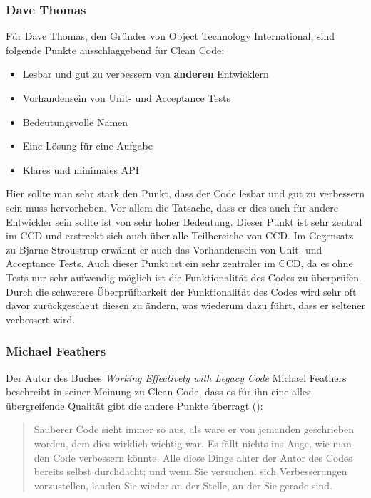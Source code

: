 \subsubsection{Dave Thomas}
Für Dave Thomas, den Gründer von Object Technology International,  sind folgende Punkte ausschlaggebend für Clean Code:

\begin{itemize}
	\item Lesbar und gut zu verbessern von \textbf{anderen} Entwicklern
	\item Vorhandensein von Unit- und Acceptance Tests
	\item Bedeutungsvolle Namen
	\item Eine Lösung für eine Aufgabe
	\item Klares und minimales API
\end{itemize}

Hier sollte man sehr stark den Punkt, dass der Code lesbar und gut zu verbessern sein muss hervorheben. Vor allem die Tatsache, dass er dies auch für andere Entwickler sein sollte ist von sehr hoher Bedeutung. Dieser Punkt ist sehr zentral im CCD und erstreckt sich auch über alle Teilbereiche von CCD. Im Gegensatz zu Bjarne Stroustrup erwähnt er auch das Vorhandensein von Unit- und Acceptance Tests. Auch dieser Punkt ist ein sehr zentraler im CCD, da es ohne Tests nur sehr aufwendig möglich ist die Funktionalität des Codes zu überprüfen. Durch die schwerere Überprüfbarkeit der Funktionalität des Codes wird sehr oft davor zurückgescheut diesen zu ändern, was wiederum dazu führt, dass er seltener verbessert wird.

\subsubsection{Michael Feathers}
Der Autor des Buches \textit{Working Effectively with Legacy Code} \cite{Feathers2013} Michael Feathers beschreibt in seiner Meinung zu Clean Code, dass es für ihn eine alles übergreifende Qualität gibt die andere Punkte überragt (\cite[Seite 36]{Martin2008}): 

\begin{quotation}
	Sauberer Code sieht immer so aus, als wäre er von jemanden geschrieben worden, dem dies wirklich wichtig war. Es fällt nichts ins Auge, wie man den Code verbessern könnte. Alle diese Dinge ahter der Autor des Codes bereits selbst durchdacht; und wenn Sie versuchen, sich Verbesserungen vorzustellen, landen Sie wieder an der Stelle, an der Sie gerade sind.
\end{quotation}

